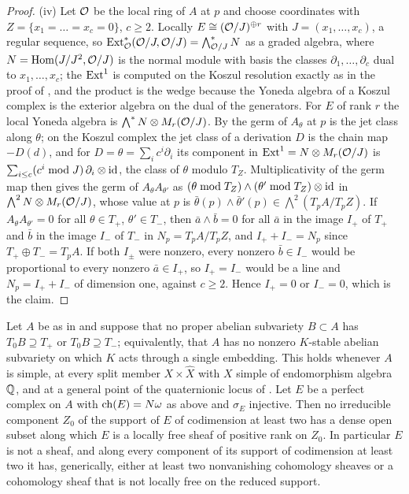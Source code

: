 \begin{proof}
(iv) Let $\mathcal{O}$ be the local ring of $A$ at $p$ and choose coordinates with
$Z=\{x_{1}=\dots=x_{c}=0\}$, $c\ge2$. Locally $E\cong(\mathcal{O}/J)^{\oplus r}$
with $J=(x_{1},\dots,x_{c})$, a regular sequence, so
$\operatorname{Ext}^{*}_{\mathcal{O}}(\mathcal{O}/J,\mathcal{O}/J)=\bigwedge^{*}_{\mathcal{O}/J}N$ as a graded algebra,
where $N=\operatorname{Hom}(J/J^{2},\mathcal{O}/J)$ is the normal module with basis the classes
$\partial_{1},\dots,\partial_{c}$ dual to $x_{1},\dots,x_{c}$; the
$\operatorname{Ext}^{1}$ is computed on the Koszul resolution exactly as in the proof of
, and the product is the wedge because the Yoneda
algebra of a Koszul complex is the exterior algebra on the dual of the
generators. For $E$ of rank $r$ the local Yoneda algebra is
$\bigwedge^{*}N\otimes M_{r}(\mathcal{O}/J)$. By  the germ of
$A_{\theta}$ at $p$ is the jet class along $\theta$; on the Koszul complex the
jet class of a derivation $D$ is the chain map $-D(d)$, and for
$D=\theta=\sum_{i}c^{i}\partial_{i}$ its component in $\operatorname{Ext}^{1}=N\otimes M_{r}(\mathcal{O}/J)$
is $\sum_{i\le c}(c^{i}\bmod J)\,\partial_{i}\otimes\operatorname{id}$, the class of
$\theta$ modulo $T_{Z}$. Multiplicativity of the germ map then gives the germ
of $A_{\theta}A_{\theta'}$ as
$(\theta\bmod T_{Z})\wedge(\theta'\bmod T_{Z})\otimes\operatorname{id}$ in
$\bigwedge^{2}N\otimes M_{r}(\mathcal{O}/J)$, whose value at $p$ is
$\bar\theta(p)\wedge\bar\theta'(p)\in\bigwedge^{2}(T_{p}A/T_{p}Z)$. If
$A_{\theta}A_{\theta'}=0$ for all $\theta\in T_{+}$, $\theta'\in T_{-}$,
then $\bar a\wedge\bar b=0$ for all $\bar a$ in the image $I_{+}$ of $T_{+}$
and $\bar b$ in the image $I_{-}$ of $T_{-}$ in $N_{p}=T_{p}A/T_{p}Z$, and
$I_{+}+I_{-}=N_{p}$ since $T_{+}\oplus T_{-}=T_{p}A$. If both $I_{\pm}$ were
nonzero, every nonzero $\bar b\in I_{-}$ would be proportional to every
nonzero $\bar a\in I_{+}$, so $I_{+}=I_{-}$ would be a line and
$N_{p}=I_{+}+I_{-}$ of dimension one, against $c\ge2$. Hence $I_{+}=0$ or
$I_{-}=0$, which is the claim.
\end{proof}

\begin{corollary}\label{cor:p2shape}
Let $A$ be as in  and suppose that no proper abelian
subvariety $B\subset A$ has $T_{0}B\supseteq T_{+}$ or $T_{0}B\supseteq T_{-}$;
equivalently, that $A$ has no nonzero $K$-stable abelian subvariety on which
$K$ acts through a single embedding. This holds whenever $A$ is simple, at
every split member $X\times\widehat X$ with $X$ simple of endomorphism
algebra $\mathbb{Q}$, and at a general point of the quaternionic locus of
.
Let $E$ be a perfect complex on $A$ with $\operatorname{ch}(E)=N\omega$ as above and
$\sigma_{E}$ injective. Then no irreducible component $Z_{0}$ of the support
of $E$ of codimension at least two has a dense open subset along which $E$ is
a locally free sheaf of positive rank on $Z_{0}$. In particular $E$ is not a
sheaf, and along every component of its support of codimension at least two
it has, generically, either at least two nonvanishing cohomology sheaves or a
cohomology sheaf that is not locally free on the reduced support.
\end{corollary}

